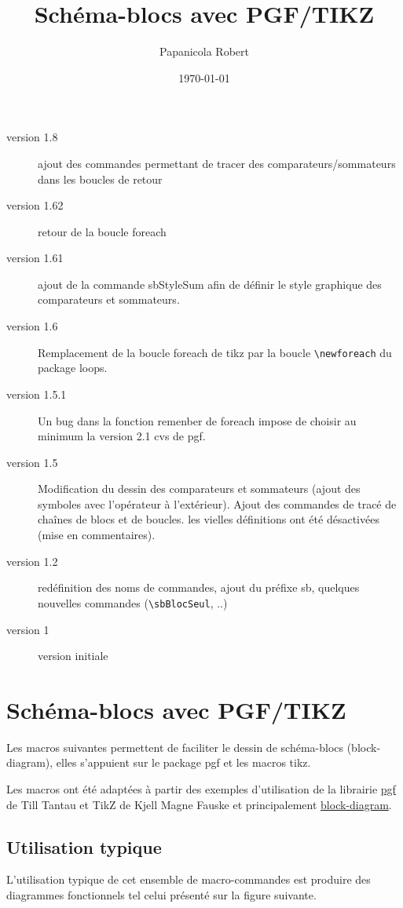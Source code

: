 \documentclass[a4paper,11pt]{article}                      %
\title{Schéma-blocs  avec  PGF/TIKZ}                                    %
\author{Papanicola Robert}                                   %
\date{\today}                                     %
\begin{document}
\maketitle

\begin{description}
\item[version 1.8] ajout des commandes permettant de tracer des comparateurs/sommateurs dans les boucles de retour
\item[version 1.62] retour de la boucle foreach
\item[version 1.61] ajout de la commande sbStyleSum  afin de définir le style graphique des comparateurs et sommateurs.
\item[version 1.6] Remplacement de la boucle foreach de tikz par la boucle \verb"\newforeach" du package loops.
\item [version 1.5.1] Un bug dans la fonction remenber de foreach impose de choisir au minimum la version 2.1 cvs de pgf.
\item [version 1.5] Modification du dessin des comparateurs et sommateurs (ajout des symboles avec l'opérateur à l'extérieur). Ajout des commandes de tracé de chaînes de blocs et de boucles. les vielles définitions ont été désactivées (mise en commentaires).
\item[version 1.2] redéfinition des noms de commandes, ajout du préfixe sb, quelques nouvelles commandes (\verb"\sbBlocSeul", ..)
\item [version 1] version initiale
\end{description}



\section{Schéma-blocs  avec  PGF/TIKZ}
Les macros suivantes permettent de faciliter le dessin de schéma-blocs (block-diagram), elles s'appuient sur le package pgf et les macros tikz.

Les macros ont été adaptées à partir des exemples d'utilisation de la librairie  \href{http://www.ctan.org/tex-archive/help/Catalogue/entries/pgf.html}{pgf} de Till Tantau et TikZ de Kjell Magne Fauske et principalement \href{http://www.fauskes.net/pgftikzexamples/tag/block-diagram/}{block-diagram}.

\subsection{Utilisation typique}
L'utilisation typique de cet ensemble de macro-commandes est produire  des diagrammes fonctionnels tel celui présenté sur la figure suivante.
\end{document}
